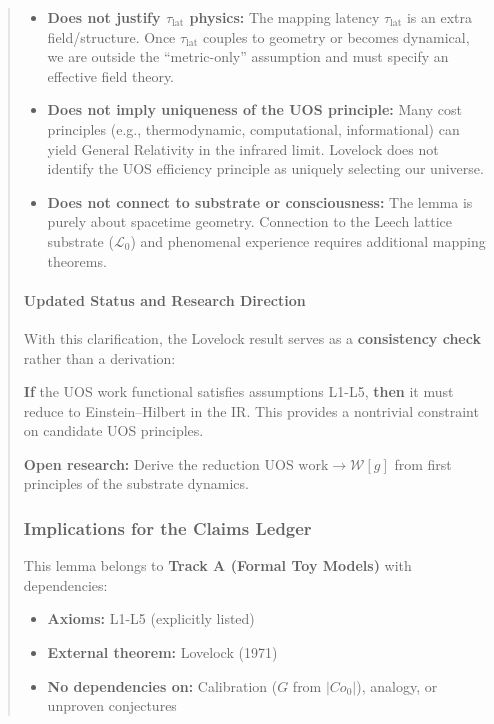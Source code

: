 \documentclass[11pt,titlepage]{article}
\begin{document}
\begin{abstract}
\begin{itemize}
\item \textbf{Does not justify $\tau_{\mathrm{lat}}$ physics:} The mapping latency $\tau_{\mathrm{lat}}$ is an extra field/structure. Once $\tau_{\mathrm{lat}}$ couples to geometry or becomes dynamical, we are outside the ``metric-only'' assumption and must specify an effective field theory.

\item \textbf{Does not imply uniqueness of the UOS principle:} Many cost principles (e.g., thermodynamic, computational, informational) can yield General Relativity in the infrared limit. Lovelock does not identify the UOS efficiency principle as uniquely selecting our universe.

\item \textbf{Does not connect to substrate or consciousness:} The lemma is purely about spacetime geometry. Connection to the Leech lattice substrate ($\mathcal{L}_0$) and phenomenal experience requires additional mapping theorems.
\end{itemize}

\paragraph{Updated Status and Research Direction}
With this clarification, the Lovelock result serves as a \textbf{consistency check} rather than a derivation:

\begin{tcolorbox}[colback=blue!5!white,colframe=blue!75!black,title=Consistency Check Passed]
\textbf{If} the UOS work functional satisfies assumptions L1-L5, \textbf{then} it must reduce to Einstein--Hilbert in the IR. This provides a nontrivial constraint on candidate UOS principles.

\textbf{Open research:} Derive the reduction $\text{UOS work} \to \mathcal{W}[g]$ from first principles of the substrate dynamics.
\end{tcolorbox}

\subsubsection{Implications for the Claims Ledger}
This lemma belongs to \textbf{Track A (Formal Toy Models)} with dependencies:
\begin{itemize}
\item \textbf{Axioms:} L1-L5 (explicitly listed)
\item \textbf{External theorem:} Lovelock (1971)
\item \textbf{No dependencies on:} Calibration ($G$ from $|Co_0|$), analogy, or unproven conjectures
\end{itemize}


\end{abstract}
\end{document}

